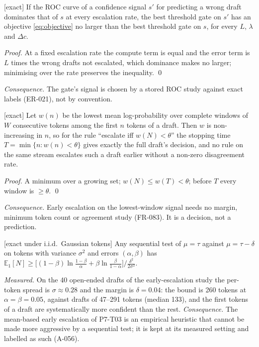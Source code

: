 \begin{proposition} \textnormal{[exact]}
\label{prop:n1}
If the ROC curve of a confidence signal $s'$ for predicting a wrong draft
dominates that of $s$ at every escalation rate, the best threshold gate on $s'$
has an objective \eqref{eq:objective} no larger than the best threshold gate on
$s$, for every $L$, $\lambda$ and $\Delta c$.
\end{proposition}
\begin{proof}
At a fixed escalation rate the compute term is equal and the error term is
$L$ times the wrong drafts not escalated, which dominance makes no larger;
minimising over the rate preserves the inequality. \qed
\end{proof}
\emph{Consequence.} The gate's signal is chosen by a stored ROC study against
exact labels (ER-021), not by convention.

\begin{proposition} \textnormal{[exact]}
\label{prop:n2}
Let $w(n)$ be the lowest mean log-probability over complete windows of $W$
consecutive tokens among the first $n$ tokens of a draft. Then $w$ is
non-increasing in $n$, so for the rule ``escalate iff $w(N)<\theta$'' the
stopping time $T=\min\{n:w(n)<\theta\}$ gives exactly the full draft's decision,
and no rule on the same stream escalates such a draft earlier without a
non-zero disagreement rate.
\end{proposition}
\begin{proof}
A minimum over a growing set; $w(N)\le w(T)<\theta$; before $T$ every window is
$\ge\theta$. \qed
\end{proof}
\emph{Consequence.} Early escalation on the lowest-window signal needs no margin,
minimum token count or agreement study (FR-083). It is a decision, not a
prediction.

\begin{proposition} \textnormal{[exact under i.i.d.\ Gaussian tokens]}
\label{prop:n3}
Any sequential test of $\mu=\tau$ against $\mu=\tau-\delta$ on tokens with
variance $\sigma^2$ and errors $(\alpha,\beta)$ has
$\mathbb E_1[N]\ge\big[(1-\beta)\ln\frac{1-\beta}{\alpha}+\beta\ln\frac{\beta}{1-\alpha}\big]\big/\frac{\delta^2}{2\sigma^2}$.
\end{proposition}
\emph{Measured.} On the 40 open-ended drafts of the early-escalation study the
per-token spread is $\sigma\approx0.28$ and the margin is $\delta=0.04$: the bound
is 260 tokens at $\alpha=\beta=0.05$, against drafts of 47--291 tokens (median
133), and the first tokens of a draft are systematically more confident than the
rest. \emph{Consequence.} The mean-based early escalation of P7-T03 is an
empirical heuristic that cannot be made more aggressive by a sequential test; it
is kept at its measured setting and labelled as such (A-056).

